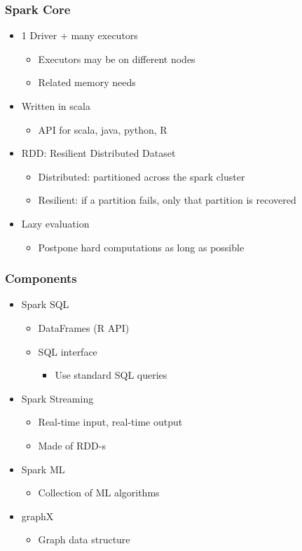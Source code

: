 \documentclass[mathserif, xcolor=table, svgnames]{beamer}
\begin{document}
\begin{frame}
  \frametitle{Spark Core}
  \begin{itemize}
  \item 1 Driver + many executors
    \begin{itemize}
    \item Executors may be on different nodes
    \item Related memory needs
    \end{itemize}
  \item Written in scala
    \begin{itemize}
    \item API for scala, java, python, R
    \end{itemize}
  \item RDD: Resilient Distributed Dataset
    \begin{itemize}
    \item Distributed: partitioned across the spark cluster
    \item Resilient: if a partition fails, only that partition is
      recovered
    \end{itemize}
  \item Lazy evaluation
    \begin{itemize}
    \item Postpone hard computations as long as possible
    \end{itemize}
  \end{itemize}
\end{frame}

\begin{frame}
  \frametitle{Components}
  \begin{itemize}
  \item Spark SQL
    \begin{itemize}
    \item DataFrames (R API)
    \item SQL interface
      \begin{itemize}
      \item Use standard SQL queries
      \end{itemize}
    \end{itemize}
  \item Spark Streaming
    \begin{itemize}
    \item Real-time input, real-time output
    \item Made of RDD-s
    \end{itemize}
  \item Spark ML
    \begin{itemize}
    \item Collection of ML algorithms
    \end{itemize}
  \item graphX
    \begin{itemize}
    \item Graph data structure
    \end{itemize}
  \end{itemize}
\end{frame}
\end{document}
